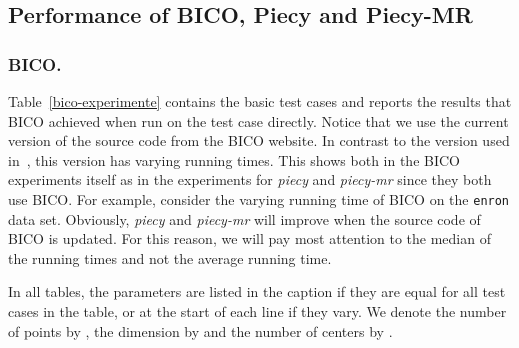 \documentclass[a4paper]{scrartcl}
\begin{document}

\subsection{Performance of BICO, Piecy and Piecy-MR}

\subsubsection*{BICO.} Table~\ref{bico-experimente} contains the basic test cases and reports the results that BICO achieved when run on the test case directly. Notice that we use the current version of the source code from the BICO website. In contrast to the version used in~\cite{FSS13}, this version has varying running times. This shows both in the BICO experiments itself as in the experiments for \emph{piecy} and \emph{piecy-mr} since they both use BICO. For example, consider the varying running time of BICO on the \texttt{enron} data set. Obviously, \emph{piecy} and \emph{piecy-mr} will improve when the source code of BICO is updated. For this reason, we will pay most attention to the median of the running times and not the average running time.

In all tables, the parameters are listed in the caption if they are equal for all test cases in the table, or at the start of each line if they vary. We denote the number of points by , the dimension by  and the number of centers by .
\end{document}
